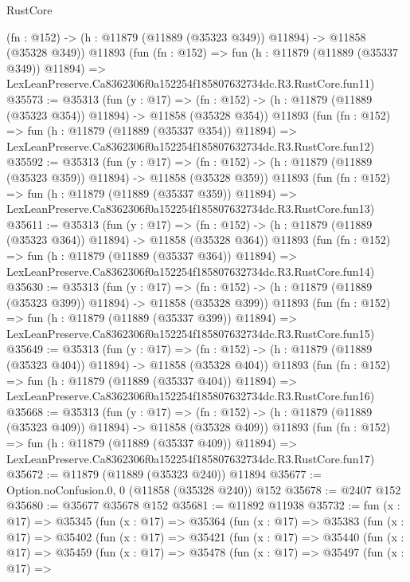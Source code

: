 \begin{lexlean}{RustCore}
\begin{coremodule}
    (fn : @152) -> (h : @11879 (@11889 (@35323 @349)) @11894) -> @11858 (@35328 @349))
    @11893
    (fun (fn : @152) =>
    fun (h : @11879 (@11889 (@35337 @349)) @11894) =>
    LexLeanPreserve.Ca8362306f0a152254f185807632734dc.R3.RustCore.fun11)
@35573 := @35313
    (fun (y : @17) =>
    (fn : @152) -> (h : @11879 (@11889 (@35323 @354)) @11894) -> @11858 (@35328 @354))
    @11893
    (fun (fn : @152) =>
    fun (h : @11879 (@11889 (@35337 @354)) @11894) =>
    LexLeanPreserve.Ca8362306f0a152254f185807632734dc.R3.RustCore.fun12)
@35592 := @35313
    (fun (y : @17) =>
    (fn : @152) -> (h : @11879 (@11889 (@35323 @359)) @11894) -> @11858 (@35328 @359))
    @11893
    (fun (fn : @152) =>
    fun (h : @11879 (@11889 (@35337 @359)) @11894) =>
    LexLeanPreserve.Ca8362306f0a152254f185807632734dc.R3.RustCore.fun13)
@35611 := @35313
    (fun (y : @17) =>
    (fn : @152) -> (h : @11879 (@11889 (@35323 @364)) @11894) -> @11858 (@35328 @364))
    @11893
    (fun (fn : @152) =>
    fun (h : @11879 (@11889 (@35337 @364)) @11894) =>
    LexLeanPreserve.Ca8362306f0a152254f185807632734dc.R3.RustCore.fun14)
@35630 := @35313
    (fun (y : @17) =>
    (fn : @152) -> (h : @11879 (@11889 (@35323 @399)) @11894) -> @11858 (@35328 @399))
    @11893
    (fun (fn : @152) =>
    fun (h : @11879 (@11889 (@35337 @399)) @11894) =>
    LexLeanPreserve.Ca8362306f0a152254f185807632734dc.R3.RustCore.fun15)
@35649 := @35313
    (fun (y : @17) =>
    (fn : @152) -> (h : @11879 (@11889 (@35323 @404)) @11894) -> @11858 (@35328 @404))
    @11893
    (fun (fn : @152) =>
    fun (h : @11879 (@11889 (@35337 @404)) @11894) =>
    LexLeanPreserve.Ca8362306f0a152254f185807632734dc.R3.RustCore.fun16)
@35668 := @35313
    (fun (y : @17) =>
    (fn : @152) -> (h : @11879 (@11889 (@35323 @409)) @11894) -> @11858 (@35328 @409))
    @11893
    (fun (fn : @152) =>
    fun (h : @11879 (@11889 (@35337 @409)) @11894) =>
    LexLeanPreserve.Ca8362306f0a152254f185807632734dc.R3.RustCore.fun17)
@35672 := @11879 (@11889 (@35323 @240)) @11894
@35677 := Option.noConfusion.{0, 0} (@11858 (@35328 @240)) @152
@35678 := @2407 @152
@35680 := @35677 @35678 @152
@35681 := @11892 @11938
@35732 := fun (x : @17) =>
  @35345
    (fun (x : @17) =>
    @35364
      (fun (x : @17) =>
      @35383
        (fun (x : @17) =>
        @35402
          (fun (x : @17) =>
          @35421
            (fun (x : @17) =>
            @35440
              (fun (x : @17) =>
              @35459
                (fun (x : @17) =>
                @35478
                  (fun (x : @17) =>
                  @35497
                    (fun (x : @17) =>

\end{coremodule}
\end{lexlean}
